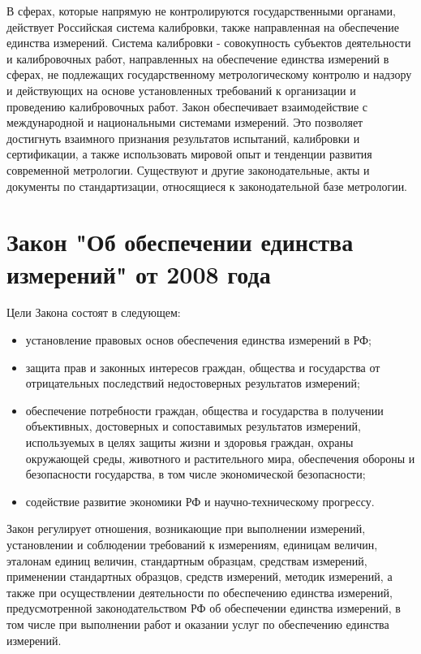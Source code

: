 \documentclass[14pt, a4paper] {ncc}
\begin{document}
    В сферах, которые напрямую не контролируются государственными органами,
    действует Российская система калибровки, также направленная на обеспечение
    единства измерений. Система калибровки - совокупность субъектов деятельности и
    калибровочных работ, направленных на обеспечение единства измерений в сферах, не
    подлежащих государственному метрологическому контролю и надзору и действующих
    на основе установленных требований к организации и проведению калибровочных
    работ. Закон обеспечивает взаимодействие с международной и национальными
    системами измерений. Это позволяет достигнуть взаимного признания
    результатов испытаний, калибровки и сертификации, а также использовать
    мировой опыт и тенденции развития современной метрологии. Существуют и
    другие законодательные, акты и документы по стандартизации, относящиеся к
    законодательной базе метрологии. \cite{micromake}

\newpage
\section{Закон "Об обеспечении единства измерений" от 2008 года}

    Цели Закона состоят в следующем:
	\begin{itemize}
		\item установление правовых основ обеспечения единства измерений в РФ;
		\item защита прав и законных интересов граждан, общества и государства от
			  отрицательных последствий недостоверных результатов измерений;
		\item обеспечение потребности граждан, общества и государства в получении
			  объективных, достоверных и сопоставимых результатов измерений,
			 используемых в целях защиты жизни и здоровья граждан, охраны
			 окружающей среды, животного и растительного мира, обеспечения
			 обороны и безопасности государства, в том числе экономической безопасности;
		\item  содействие развитие экономики РФ и научно-техническому прогрессу.
	\end{itemize}

	Закон регулирует отношения, возникающие при выполнении измерений,
	установлении и соблюдении требований к измерениям, единицам величин,
	эталонам единиц величин, стандартным образцам, средствам измерений,
	применении стандартных образцов, средств измерений, методик измерений, а также
	при осуществлении деятельности по обеспечению единства измерений,
	предусмотренной законодательством РФ об обеспечении единства измерений,
	в том числе при выполнении работ и оказании услуг по обеспечению единства
	измерений. \cite{federal}
\end{document}
